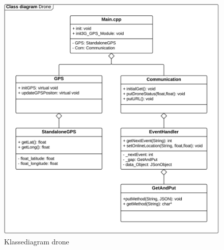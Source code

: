 \begin{figure}[H]
	\centering
	\includegraphics[width=1\textwidth]{Billeder/classdiagram.png}
	\vspace{-0.6cm}	
	\caption{Klassediagram drone}
	\label{fig:class_drone}

\end{figure}

